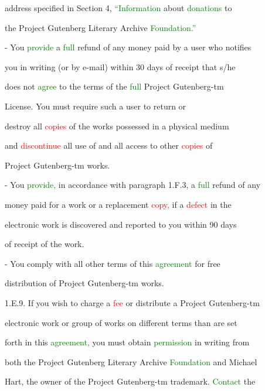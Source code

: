  address specified in Section 4, \textcolor{green}{“Information} about \textcolor{green}{donations} to

 the Project Gutenberg Literary Archive \textcolor{green}{Foundation.”}



 - You \textcolor{green}{provide} a \textcolor{green}{full} refund of any \textcolor{BurntOrange}{money} paid by a user who notifies

 you in writing (or by e-mail) within 30 days of receipt that s/he

 does not \textcolor{green}{agree} to the terms of the \textcolor{green}{full} Project Gutenberg-tm

 License. You must require such a user to return or

 destroy all \textcolor{red}{copies} of the works \textcolor{BurntOrange}{possessed} in a physical medium

 and \textcolor{red}{discontinue} all use of and all access to other \textcolor{red}{copies} of

 Project Gutenberg-tm works.



 - You \textcolor{green}{provide,} in accordance with paragraph 1.F.3, a \textcolor{green}{full} refund of any

 \textcolor{BurntOrange}{money} paid for a work or a replacement \textcolor{red}{copy,} if a \textcolor{red}{defect} in the

 electronic work is discovered and reported to you within 90 days

 of receipt of the work.



 - You comply with all other terms of this \textcolor{green}{agreement} for free

 distribution of Project Gutenberg-tm works.



 1.E.9. If you wish to charge a \textcolor{red}{fee} or distribute a Project Gutenberg-tm

 electronic work or group of works on different terms than are set

 forth in this \textcolor{green}{agreement,} you must obtain \textcolor{green}{permission} in writing from

 both the Project Gutenberg Literary Archive \textcolor{green}{Foundation} and Michael

 Hart, the owner of the Project Gutenberg-tm trademark. \textcolor{green}{Contact} the

